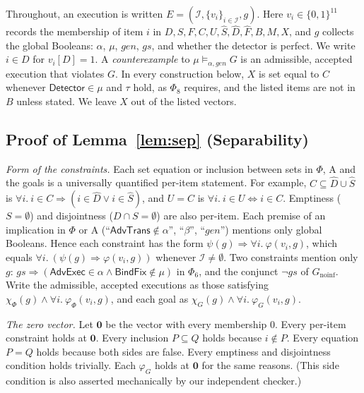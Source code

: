 
Throughout, an execution is written $E=(\mathcal I,\{v_i\}_{i\in\mathcal I},g)$. Here
$v_i\in\{0,1\}^{11}$ records the membership of item $i$ in
$D,S,F,C,U,\hat S,\hat D,\hat F,B,M,X$, and $g$ collects the global Booleans: $\alpha$,
$\mu$, $\mathit{gen}$, $\mathit{gs}$, and whether the detector is perfect. We write
$i\in D$ for $v_i[D]=1$. A \emph{counterexample} to $\mu\models_{\alpha,\mathit{gen}}G$ is an
admissible, accepted execution that violates $G$. In every construction below, $X$ is set
equal to $C$ whenever $\textsf{Detector}\in\mu$ and $\tau$ hold, as $\Phi_8$ requires, and
the listed items are not in $B$ unless stated. We leave $X$ out of the listed vectors.

\subsection*{Proof of Lemma~\ref{lem:sep} (Separability)}

\emph{Form of the constraints.}
Each set equation or inclusion between sets in $\Phi$, $\mathrm A$ and the goals is a
universally quantified per-item statement. For example, $C\subseteq\hat D\cup\hat S$ is
$\forall i.\ i\in C\Rightarrow(i\in\hat D\vee i\in\hat S)$, and $U=C$ is
$\forall i.\ i\in U\Leftrightarrow i\in C$. Emptiness ($S=\emptyset$) and disjointness
($D\cap S=\emptyset$) are also per-item. Each premise of an implication in $\Phi$ or
$\mathrm A$ (``$\textsf{AdvTrans}\notin\alpha$'', ``$\beta$'', ``$\mathit{gen}$'') mentions
only global Booleans. Hence each constraint has the form
$\psi(g)\Rightarrow\forall i.\ \varphi(v_i,g)$, which equals
$\forall i.\ (\psi(g)\Rightarrow\varphi(v_i,g))$ whenever $\mathcal I\neq\emptyset$.
Two constraints mention only $g$:
$\mathit{gs}\Rightarrow(\textsf{AdvExec}\in\alpha\wedge\textsf{BindFix}\notin\mu)$ in
$\Phi_6$, and the conjunct $\neg\mathit{gs}$ of $G_{\mathrm{noinf}}$. Write the admissible,
accepted executions as those satisfying
$\chi_\Phi(g)\wedge\forall i.\ \varphi_\Phi(v_i,g)$, and each goal as
$\chi_G(g)\wedge\forall i.\ \varphi_G(v_i,g)$.

\emph{The zero vector.}
Let $\mathbf 0$ be the vector with every membership $0$. Every per-item constraint holds
at $\mathbf 0$. Every inclusion $P\subseteq Q$ holds because $i\notin P$. Every equation
$P=Q$ holds because both sides are false. Every emptiness and disjointness condition holds
trivially. Each $\varphi_G$ holds at $\mathbf 0$ for the same reasons. (This side condition
is also asserted mechanically by our independent checker.)

